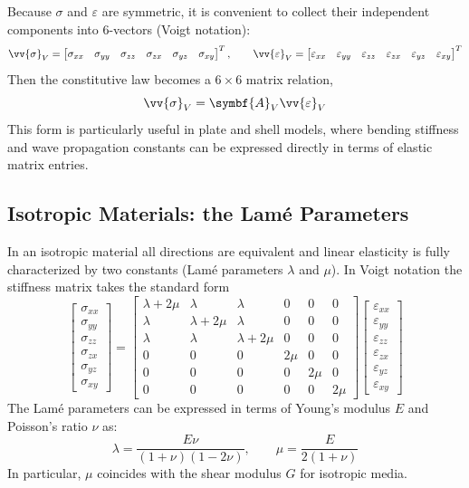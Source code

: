 Because \( \sigma \) and \( \varepsilon \) are symmetric, it is convenient to collect their independent components into 6-vectors (Voigt notation):
\[
\vv{\sigma}_V = 
\begin{bmatrix}
\sigma_{xx}&\sigma_{yy}&\sigma_{zz}&\sigma_{zx}&\sigma_{yz}&\sigma_{xy}
\end{bmatrix}^{T},
\qquad
\vv{\varepsilon}_V = 
\begin{bmatrix}
\varepsilon_{xx}&\varepsilon_{yy}&\varepsilon_{zz}&\varepsilon_{zx}&\varepsilon_{yz}&\varepsilon_{xy}
\end{bmatrix}^{T}
\]
Then the constitutive law becomes a \( 6 \times 6 \) matrix relation,
\[
\vv{\sigma}_V = \symbf{A}_V\vv{\varepsilon}_V
\]
This form is particularly useful in plate and shell models, where bending stiffness and wave propagation constants can be expressed directly in terms of elastic matrix entries.

\subsection{Isotropic Materials: the Lamé Parameters}

In an isotropic material all directions are equivalent and linear elasticity is fully characterized by two constants (Lamé parameters \( \lambda \) and \( \mu \)). In Voigt notation the stiffness matrix takes the standard form
\[
\begin{bmatrix}
\sigma_{xx}\\\sigma_{yy}\\\sigma_{zz}\\\sigma_{zx}\\\sigma_{yz}\\\sigma_{xy}
\end{bmatrix}
 = 
\begin{bmatrix}
\lambda+2\mu & \lambda      & \lambda      & 0   & 0   & 0\\
\lambda      & \lambda+2\mu & \lambda      & 0   & 0   & 0\\
\lambda      & \lambda      & \lambda+2\mu & 0   & 0   & 0\\
0            & 0            & 0            & 2\mu& 0   & 0\\
0            & 0            & 0            & 0   & 2\mu& 0\\
0            & 0            & 0            & 0   & 0   & 2\mu
\end{bmatrix}
\begin{bmatrix}
\varepsilon_{xx}\\\varepsilon_{yy}\\\varepsilon_{zz}\\\varepsilon_{zx}\\\varepsilon_{yz}\\\varepsilon_{xy}
\end{bmatrix}
\]
The Lamé parameters can be expressed in terms of Young's modulus \( E \) and Poisson's ratio \( \nu \) as:
\[
\lambda = \frac{E\nu}{(1+\nu)(1-2\nu)},
\qquad
\mu = \frac{E}{2(1+\nu)}
\]
In particular, \( \mu \) coincides with the shear modulus \( G \) for isotropic media.

